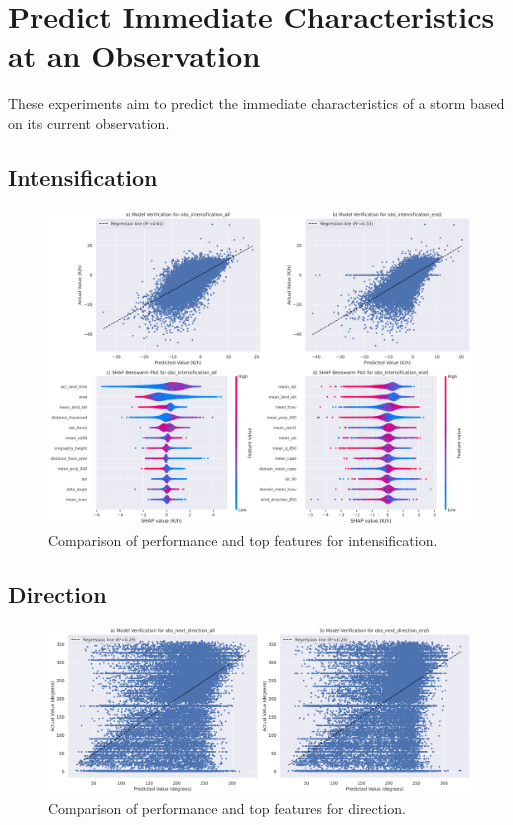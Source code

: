 \section{Predict Immediate Characteristics at an Observation}

These experiments aim to predict the immediate characteristics of a storm based on its current observation.

\subsection{Intensification}

\begin{figure}[h]
    \centering
    \includegraphics[width=\textwidth]{../figures/generated/experiments/obs_intensification/obs_intensification_summary.png}
    \caption{Comparison of performance and top features for intensification.}
    \label{fig:obs_intensification_summary}
\end{figure}

\subsection{Direction}

\begin{figure}[h]
    \centering
    \includegraphics[width=\textwidth]{../figures/generated/experiments/obs_next_direction/obs_next_direction_summary.png}
    \caption{Comparison of performance and top features for direction.}
    \label{fig:obs_direction_summary}
\end{figure}

